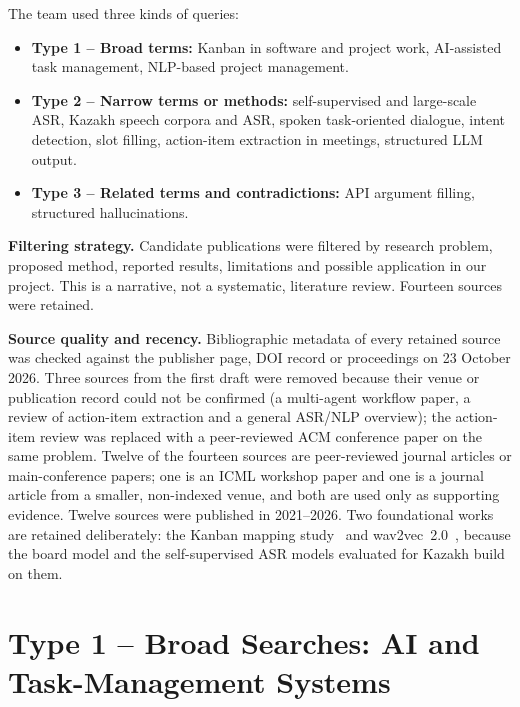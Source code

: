 \documentclass[11pt,a4paper]{article}
\begin{document}
The team used three kinds of queries:
\begin{itemize}
  \item \textbf{Type 1 -- Broad terms:} Kanban in software and project work, AI-assisted task management, NLP-based project management.
  \item \textbf{Type 2 -- Narrow terms or methods:} self-supervised and large-scale ASR, Kazakh speech corpora and ASR, spoken task-oriented dialogue, intent detection, slot filling, action-item extraction in meetings, structured LLM output.
  \item \textbf{Type 3 -- Related terms and contradictions:} API argument filling, structured hallucinations.
\end{itemize}

\textbf{Filtering strategy.} Candidate publications were filtered by research problem, proposed method, reported results, limitations and possible application in our project. This is a narrative, not a systematic, literature review. Fourteen sources were retained.

\textbf{Source quality and recency.} Bibliographic metadata of every retained source was checked against the publisher page, DOI record or proceedings on 23 October 2026. Three sources from the first draft were removed because their venue or publication record could not be confirmed (a multi-agent workflow paper, a review of action-item extraction and a general ASR/NLP overview); the action-item review was replaced with a peer-reviewed ACM conference paper on the same problem. Twelve of the fourteen sources are peer-reviewed journal articles or main-conference papers; one is an ICML workshop paper and one is a journal article from a smaller, non-indexed venue, and both are used only as supporting evidence. Twelve sources were published in 2021--2026. Two foundational works are retained deliberately: the Kanban mapping study~\cite{ahmad2018kanban} and wav2vec~2.0~\cite{baevski2020wav2vec}, because the board model and the self-supervised ASR models evaluated for Kazakh build on them.

\section{Type 1 -- Broad Searches: AI and Task-Management Systems}
\end{document}
